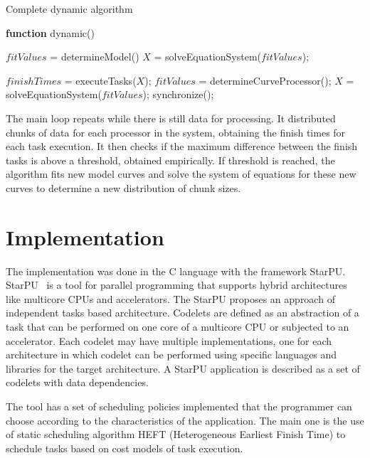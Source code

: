 \documentclass[journal]{IEEEtran}
\begin{document}
\begin{algorithm}

\caption{Complete dynamic algorithm}
\label{alg1}

\begin{algorithmic}		

\STATE \textbf{function} dynamic()

\STATE $fitValues$ = determineModel()
\STATE $X$ = solveEquationSystem($fitValues$);


	\STATE $finishTimes$ = executeTasks($X$);
		\STATE $fitValues$ = determineCurveProcessor();
                \STATE $X$ = solveEquationSystem($fitValues$);
                \STATE synchronize();
    	\ENDIF
\ENDWHILE

\end{algorithmic}
\end{algorithm}

The main loop repeats while there is still data for processing. It distributed
chunks of data for each processor in the system, obtaining the finish times for
each task execution. It then checks if the maximum difference between the finish
tasks is above a threshold, obtained empirically. If threshold is reached, the
algorithm fits new model curves and solve the system of equations for these new
curves to determine a new distribution of chunk sizes.


\section{Implementation}

The implementation was done in the C language with the framework StarPU.
StarPU~\cite{starpu} is a tool for parallel programming that supports hybrid
architectures like multicore CPUs and accelerators. The StarPU proposes an
approach of independent tasks based architecture. Codelets are defined as an
abstraction of a task that can be performed on one core of a multicore CPU or
subjected to an accelerator. Each codelet may have multiple implementations, one
for each architecture in which codelet can be performed using specific languages
and libraries for the target architecture. A StarPU application is described as
a set of codelets with data dependencies.

The tool has a set of scheduling policies implemented that the programmer can
choose according to the characteristics of the application. The main one is the
use of static scheduling algorithm HEFT (Heterogeneous Earliest Finish Time) to
schedule tasks based on cost models of task execution.
\end{document}
